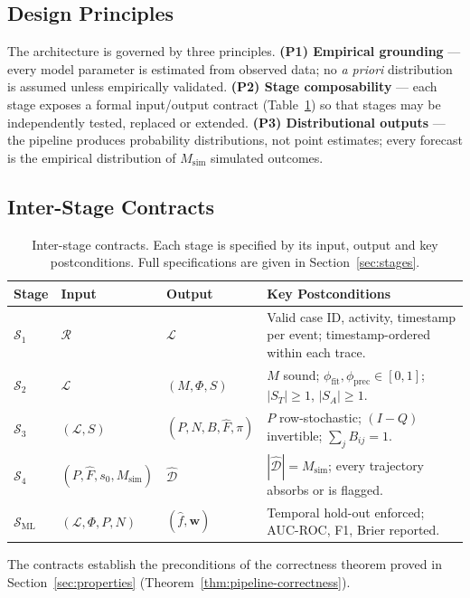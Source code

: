 \subsection{Design Principles}
\label{sec:arch-principles}

The architecture is governed by three principles.
\textbf{(P1) Empirical grounding} --- every model parameter is estimated
from observed data; no \emph{a priori} distribution is assumed unless
empirically validated.
\textbf{(P2) Stage composability} --- each stage exposes a formal
input/output contract (Table~\ref{tab:contracts}) so that stages may be
independently tested, replaced or extended.
\textbf{(P3) Distributional outputs} --- the pipeline produces
probability distributions, not point estimates; every forecast is the
empirical distribution of $M_{\text{sim}}$ simulated outcomes.

\subsection{Inter-Stage Contracts}
\label{sec:arch-contracts}

\begin{table}[ht]
\centering
\caption{Inter-stage contracts. Each stage is specified by its input,
output and key postconditions. Full specifications are given in
Section~\ref{sec:stages}.}
\label{tab:contracts}
\small
\begin{tabular}{@{}l l l p{5.5cm}@{}}
\toprule
\textbf{Stage} & \textbf{Input} & \textbf{Output} &
\textbf{Key Postconditions} \\
\midrule
$\mathcal{S}_1$    & $\mathcal{R}$
                   & $\mathcal{L}$
                   & Valid case ID, activity, timestamp per event;
                     timestamp-ordered within each trace. \\
$\mathcal{S}_2$    & $\mathcal{L}$
                   & $(M, \Phi, S)$
                   & $M$ sound; $\phi_{\text{fit}}, \phi_{\text{prec}}
                     \in [0,1]$; $|S_T|\ge1$, $|S_A|\ge1$. \\
$\mathcal{S}_3$    & $(\mathcal{L}, S)$
                   & $(P, N, B, \hat{F}, \pi)$
                   & $P$ row-stochastic; $(I-Q)$ invertible;
                     $\sum_j B_{ij}=1$. \\
$\mathcal{S}_4$    & $(P, \hat{F}, s_0, M_{\text{sim}})$
                   & $\hat{\mathcal{D}}$
                   & $|\hat{\mathcal{D}}| = M_{\text{sim}}$;
                     every trajectory absorbs or is flagged. \\
$\mathcal{S}_{\text{ML}}$ & $(\mathcal{L},\Phi,P,N)$
                   & $(\hat{f}, \mathbf{w})$
                   & Temporal hold-out enforced; AUC-ROC, F1, Brier
                     reported. \\
\bottomrule
\end{tabular}
\end{table}

The contracts establish the preconditions of the correctness theorem
proved in Section~\ref{sec:properties}
(Theorem~\ref{thm:pipeline-correctness}).
